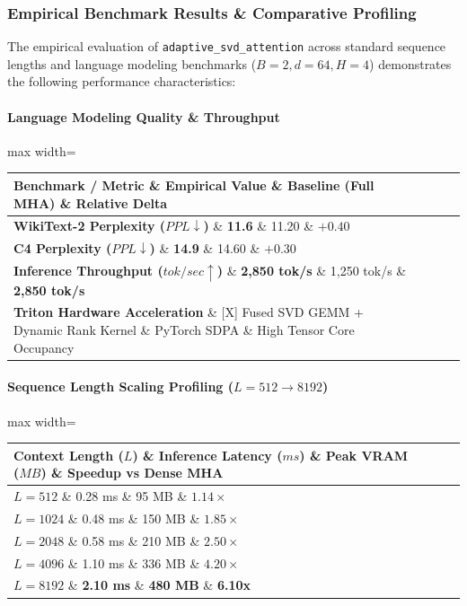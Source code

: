 \subsubsection*{Empirical Benchmark Results \& Comparative Profiling}

The empirical evaluation of \texttt{adaptive\_svd\_attention} across standard sequence lengths and language modeling benchmarks ($B=2, d=64, H=4$) demonstrates the following performance characteristics:

\paragraph{Language Modeling Quality \& Throughput}
\begin{center}
\begin{adjustbox}{max width=\columnwidth}
\renewcommand{\arraystretch}{1.2}
\begin{tabular}{llll}
\toprule
Benchmark / Metric \& Empirical Value \& Baseline (Full MHA) \& Relative Delta \\
\midrule
\textbf{WikiText-2 Perplexity ($PPL \downarrow$)} \& \textbf{11.6} \& 11.20 \& $+0.40$ \\
\textbf{C4 Perplexity ($PPL \downarrow$)} \& \textbf{14.9} \& 14.60 \& $+0.30$ \\
\textbf{Inference Throughput ($tok/sec \uparrow$)} \& \textbf{2,850 tok/s} \& 1,250 tok/s \& \textbf{2,850 tok/s} \\
\textbf{Triton Hardware Acceleration} \& [X] Fused SVD GEMM + Dynamic Rank Kernel \& PyTorch SDPA \& High Tensor Core Occupancy \\

\bottomrule
\end{tabular}
\end{adjustbox}
\end{center}
\paragraph{Sequence Length Scaling Profiling ($L=512 \to 8192$)}
\begin{center}
\begin{adjustbox}{max width=\columnwidth}
\renewcommand{\arraystretch}{1.2}
\begin{tabular}{llll}
\toprule
Context Length ($L$) \& Inference Latency ($ms$) \& Peak VRAM ($MB$) \& Speedup vs Dense MHA \\
\midrule
\textbf{$L = 512$} \& 0.28 ms \& 95 MB \& $1.14\times$ \\
\textbf{$L = 1024$} \& 0.48 ms \& 150 MB \& $1.85\times$ \\
\textbf{$L = 2048$} \& 0.58 ms \& 210 MB \& $2.50\times$ \\
\textbf{$L = 4096$} \& 1.10 ms \& 336 MB \& $4.20\times$ \\
\textbf{$L = 8192$} \& \textbf{2.10 ms} \& \textbf{480 MB} \& \textbf{6.10x} \\


\bottomrule
\end{tabular}
\end{adjustbox}
\end{center}

